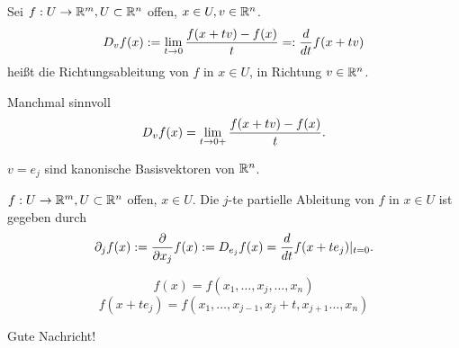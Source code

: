 \documentclass[../ana2.tex]{subfiles}
\begin{document}
\begin{defi}[Richtungsableitung]
    Sei \( f:U\rightarrow \mathbb{R}^m, U \subset \mathbb{R}^n \) offen, 
    \( x \in U, v \in \mathbb{R}^n \).
    \[ D_v f(x) := \lim\limits_{t\rightarrow{}0} \frac{f(x + tv) - f(x)}{t} 
    =: \frac{d}{dt} f(x + tv) \]
    heißt die Richtungsableitung von \( f \) in \( x\in U \), 
    in Richtung \( v \in \mathbb{R}^n \).
\end{defi}
\begin{bem}
    Manchmal sinnvoll
    \[ D_v f(x) = \lim\limits_{t\rightarrow{}0+} \frac{f(x + tv) - f(x)}{t}. \]
\end{bem}
\begin{bsp}
    \( v = e_j \) sind kanonische Basisvektoren von \( \mathbb{R}^n \).
\end{bsp}
\begin{defi}
    \( f:U\rightarrow \mathbb{R}^m, U \subset \mathbb{R}^n \) offen, \( x\in U \).
    Die \(j\)-te partielle Ableitung von \(f\) in \(x \in U\) 
    ist gegeben durch
    \[ \partial_j f(x) := \frac{\partial}{\partial x_j} f(x) 
    := D_{e_j} f(x) = \frac{d}{dt} f(x + t e_j) \vert_{t=0}. \]
\end{defi}
\begin{bem}
    \[ f(x) = f(x_1, \ldots, x_j, \ldots, x_n) \]
    \[ f(x+t e_j) = f(x_1, \ldots, x_{j-1}, 
    x_j + t, x_{j+1} \ldots, x_n) \]
\end{bem}
Gute Nachricht!
\end{document}
